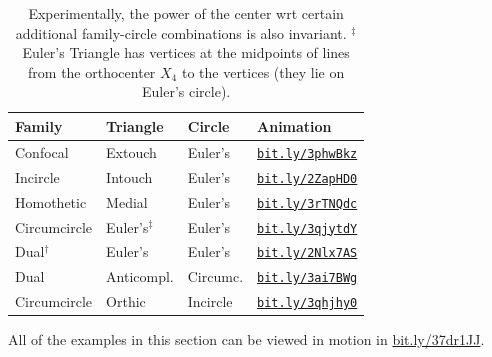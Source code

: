 \begin{table}
\begin{tabular}{|l|l|l|l|}
\hline
Family & Triangle & Circle & Animation \\
\hline
Confocal & Extouch & Euler's & \href{https://bit.ly/3phwBkz}{\texttt{bit.ly/3phwBkz}} \\
Incircle & Intouch & Euler's & \href{https://bit.ly/2ZapHD0}{\texttt{bit.ly/2ZapHD0}} \\
Homothetic & Medial & Euler's & \href{https://bit.ly/3rTNQdc}{\texttt{bit.ly/3rTNQdc}} \\
Circumcircle & Euler's$^\ddagger$ & Euler's & \href{https://bit.ly/3qjytdY}{\texttt{bit.ly/3qjytdY}} \\
Dual$^\dagger$ & Euler's & Euler's & \href{https://bit.ly/2Nlx7AS}{\texttt{bit.ly/2Nlx7AS}}\\
Dual & Anticompl. & Circumc. & \href{https://bit.ly/3ai7BWg}{\texttt{bit.ly/3ai7BWg}}\\
Circumcircle & Orthic & Incircle & \href{https://bit.ly/3qhjhy0}{\texttt{bit.ly/3qhjhy0}} \\
\hline
\end{tabular}
\caption{Experimentally, the power of the center wrt certain additional family-circle combinations is also invariant. $^\ddagger$Euler's Triangle \cite{mw} has vertices at the midpoints of lines from the orthocenter $X_4$ to the vertices (they lie on Euler's circle).}
\label{tab:addtl-circles}
\end{table}

All of the examples in this section can be viewed in motion in \href{https://bit.ly/37dr1JJ}{bit.ly/37dr1JJ}.